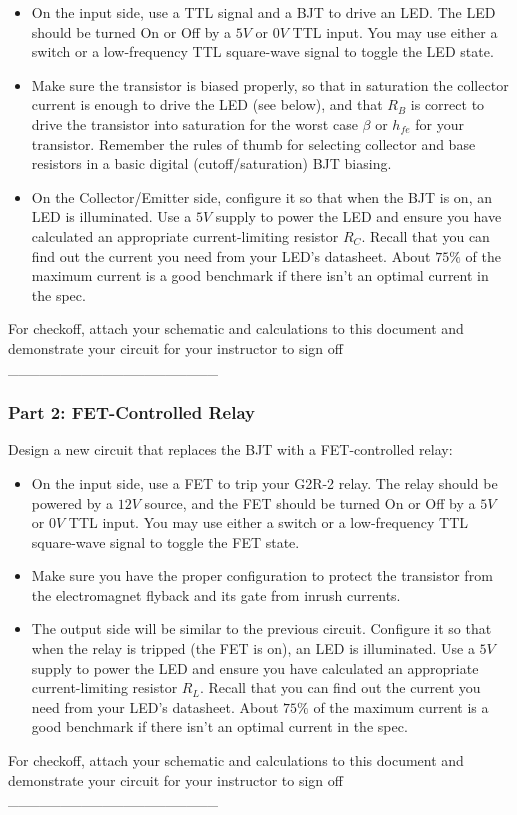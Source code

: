 \documentclass[
  letterpaper,
  DIV=11,
  numbers=noendperiod,
  oneside]{scrartcl}
\begin{document}
\begin{itemize}
\item
  On the input side, use a TTL signal and a BJT to drive an LED. The LED
  should be turned On or Off by a \(5V\) or \(0V\) TTL input. You may
  use either a switch or a low-frequency TTL square-wave signal to
  toggle the LED state.
\item
  Make sure the transistor is biased properly, so that in saturation the
  collector current is enough to drive the LED (see below), and that
  \(R_B\) is correct to drive the transistor into saturation for the
  worst case \(\beta\) or \(h_{fe}\) for your transistor. Remember the
  rules of thumb for selecting collector and base resistors in a basic
  digital (cutoff/saturation) BJT biasing.
\item
  On the Collector/Emitter side, configure it so that when the BJT is
  on, an LED is illuminated. Use a \(5V\) supply to power the LED and
  ensure you have calculated an appropriate current-limiting resistor
  \(R_C\). Recall that you can find out the current you need from your
  LED's datasheet. About \(75\%\) of the maximum current is a good
  benchmark if there isn't an optimal current in the spec.
\end{itemize}

For checkoff, attach your schematic and calculations to this document
and demonstrate your circuit for your instructor to sign off
\_\_\_\_\_\_\_\_\_\_\_\_\_\_\_\_\_\_\_\_

\newpage{}

\hypertarget{part-2-fet-controlled-relay}{%
\subsubsection{Part 2: FET-Controlled
Relay}\label{part-2-fet-controlled-relay}}

Design a new circuit that replaces the BJT with a FET-controlled relay:

\begin{itemize}
\item
  On the input side, use a FET to trip your G2R-2 relay. The relay
  should be powered by a \(12 V\) source, and the FET should be turned
  On or Off by a \(5V\) or \(0V\) TTL input. You may use either a switch
  or a low-frequency TTL square-wave signal to toggle the FET state.
\item
  Make sure you have the proper configuration to protect the transistor
  from the electromagnet flyback and its gate from inrush currents.
\item
  The output side will be similar to the previous circuit. Configure it
  so that when the relay is tripped (the FET is on), an LED is
  illuminated. Use a \(5V\) supply to power the LED and ensure you have
  calculated an appropriate current-limiting resistor \(R_L\). Recall
  that you can find out the current you need from your LED's datasheet.
  About \(75\%\) of the maximum current is a good benchmark if there
  isn't an optimal current in the spec.
\end{itemize}

For checkoff, attach your schematic and calculations to this document
and demonstrate your circuit for your instructor to sign off
\_\_\_\_\_\_\_\_\_\_\_\_\_\_\_\_\_\_\_\_
\end{document}
